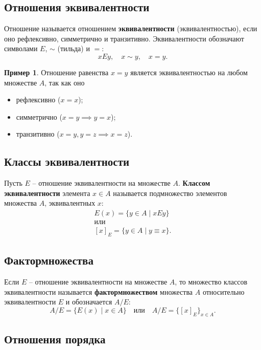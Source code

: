 \documentclass[a5paper, 11pt]{extarticle}
\theoremstyle{definition}
\newtheorem*{example*}{Пример}
\theoremstyle{definition}
\theoremstyle{definition}
\numberwithin{figure}{section}
\numberwithin{table}{section}
\begin{document}
\subsection{Отношения эквивалентности}

Отношение называется отношением \textbf{эквивалентности} (эквивалентностью), если оно рефлексивно, симметрично и транзитивно. Эквивалентности обозначают символами \(E\), \(\sim\) (тильда) и \(=\):
\[
    xEy,
    \quad
    x \sim y,
    \quad
    x = y.
\]

\begin{example*}
    Отношение равенства \(x = y\) является эквивалентностью на любом множестве \(A\), так как оно
    \begin{itemize}
        \item рефлексивно (\(x = x\));
        \item симметрично (\(x = y \implies y = x\));
        \item транзитивно (\(x = y, y = z \implies x = z\)).
    \end{itemize}
\end{example*}


\subsection{Классы эквивалентности}

Пусть \(E\) -- отношение эквивалентности на множестве \(A\). \textbf{Классом эквивалентности} элемента \(x \in A\) называется подмножество элементов множества \(A\), эквивалентных \(x\):
\begin{gather*}
    E(x) = \{y \in A \mid xEy\}
    \\ \text{или} \\
    [x]_E = \{y \in A \mid y \equiv x\}.
\end{gather*}

\subsection{Фактормножества}

Если \(E\) -- отношение эквивалентности на множестве \(A\), то множество классов эквивалентности называется \textbf{фактормножеством} множества \(A\) относительно эквивалентности \(E\) и обозначается \(A \slash E\):
\[
    A \slash E = \{E(x) \mid x \in A\}
    \quad
    \text{или}
    \quad
    A \slash E = \{[x]_E\}_{x \in A}.
\]

\subsection{Отношения порядка}
\end{document}
